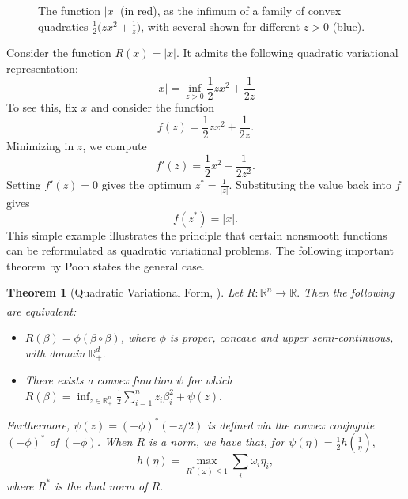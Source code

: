 \documentclass[11pt, twoside]{report}
\newtheorem{theorem}{Theorem}[section]
\begin{document}
\begin{figure}[h!]
    \centering
    \caption{The function $|x|$ (in red), as the infimum of a family of convex quadratics $\tfrac12\big(z x^2 + \tfrac{1}{z}\big)$, with several shown for different $z>0$ (blue).}
    \label{fig:variational_abs}
\end{figure}
Consider the function $R(x) = |x|$. It admits the following quadratic variational representation:
$$|x| = \inf_{z>0}  \frac{1}{2}zx^2 + \frac{1}{2z}$$
To see this, fix $x$ and consider the function
$$f(z) = \frac{1}{2}zx^2 + \frac{1}{2z}.$$
Minimizing in $z$, we compute
$$f'(z) = \frac{1}{2}x^2 - \frac{1}{2z^2}.$$
Setting $f'(z) = 0$ gives the optimum $z^* = \frac{1}{|z|}$. Substituting the value back into $f$ gives
$$f(z^*) = |x|.$$ This simple example illustrates the principle that certain nonsmooth functions can be reformulated as quadratic variational problems. The following important theorem by Poon\cite{poon} states the general case.
\begin{theorem}[Quadratic Variational Form, \cite{poon}] \label{qvf_thm}
Let $R:\mathbb{R}^n \xrightarrow[]{} \mathbb{R}.$ Then the following are equivalent:
\begin{itemize}
    \item $R(\beta) = \phi(\beta \circ \beta)$, where $\phi$ is proper, concave and upper semi-continuous, with domain $\mathbb{R}^d_+.$
    \item There exists a convex function $\psi$ for which $R(\beta) = \inf_{z \in \mathbb{R}^n_+} \frac{1}{2} \sum_{i=1}^n z_i \beta_i^2 + \psi(z).$
\end{itemize}
Furthermore, $\psi(z) = (-\phi)^* (-z/2)$ is defined via the convex conjugate $(-\phi)^*$ of $(-\phi)$. When $R$ is a norm, we have that, for $\psi(\eta) = \frac{1}{2} h(\frac{1}{\eta}),$
\[h(\eta) = \max_{R^*(\omega) \leq 1} \sum_i \omega_i \eta_i,\]
where $R^*$ is the dual norm of $R$.
\end{theorem}
\end{document}
